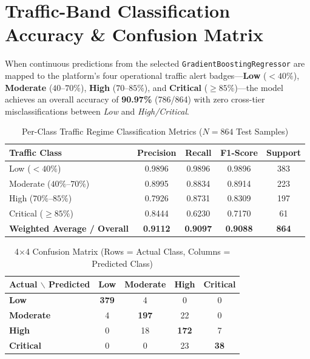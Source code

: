 \documentclass[12pt,a4paper,oneside]{report}
\begin{document}
\section{Traffic-Band Classification Accuracy \& Confusion Matrix}
When continuous predictions from the selected \texttt{GradientBoostingRegressor} are mapped to the platform's four operational traffic alert badges---\textbf{Low} ($<40\%$), \textbf{Moderate} ($40\text{--}70\%$), \textbf{High} ($70\text{--}85\%$), and \textbf{Critical} ($\ge 85\%$)---the model achieves an overall accuracy of \textbf{90.97\%} (786/864) with zero cross-tier misclassifications between \textit{Low} and \textit{High/Critical}.

\begin{table}[H]
\centering
\caption{Per-Class Traffic Regime Classification Metrics ($N = 864$ Test Samples)}
\label{tab:class_metrics}
\begin{tabular}{lcccc}
\toprule
\textbf{Traffic Class} & \textbf{Precision} & \textbf{Recall} & \textbf{F1-Score} & \textbf{Support} \\
\midrule
Low ($< 40\%$) & 0.9896 & 0.9896 & 0.9896 & 383 \\
Moderate ($40\%\text{--}70\%$) & 0.8995 & 0.8834 & 0.8914 & 223 \\
High ($70\%\text{--}85\%$) & 0.7926 & 0.8731 & 0.8309 & 197 \\
Critical ($\ge 85\%$) & 0.8444 & 0.6230 & 0.7170 & 61 \\
\midrule
\textbf{Weighted Average / Overall} & \textbf{0.9112} & \textbf{0.9097} & \textbf{0.9088} & \textbf{864} \\
\bottomrule
\end{tabular}
\end{table}

\begin{table}[H]
\centering
\caption{4$\times$4 Confusion Matrix (Rows = Actual Class, Columns = Predicted Class)}
\label{tab:conf_matrix}
\begin{tabular}{lcccc}
\toprule
\textbf{Actual $\backslash$ Predicted} & \textbf{Low} & \textbf{Moderate} & \textbf{High} & \textbf{Critical} \\
\midrule
\textbf{Low}      & \textbf{379} & 4   & 0   & 0  \\
\textbf{Moderate} & 4   & \textbf{197} & 22  & 0  \\
\textbf{High}     & 0   & 18  & \textbf{172} & 7  \\
\textbf{Critical} & 0   & 0   & 23  & \textbf{38} \\
\bottomrule
\end{tabular}
\end{table}
\end{document}
